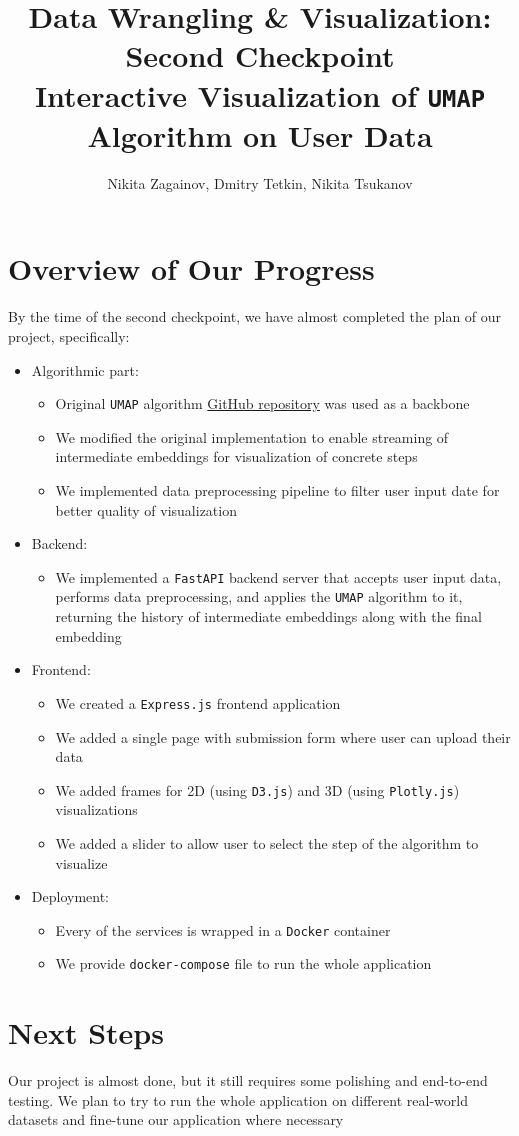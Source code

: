 \documentclass{article}
\title{Data Wrangling \& Visualization: Second Checkpoint \\
 \textbf{Interactive Visualization of \texttt{UMAP} Algorithm on User Data}}
\author{Nikita Zagainov, Dmitry Tetkin, Nikita Tsukanov}
\date{\monthname[\the\month] \the\year}
\begin{document}
\maketitle

\section{Overview of Our Progress}

By the time of the second checkpoint, we have almost completed the plan of our project, specifically:
\begin{itemize}
	\item Algorithmic part:
	      \begin{itemize}
		      \item Original \texttt{UMAP} algorithm \href{https://github.com/lmcinnes/umap}{GitHub repository} was used as a backbone
		      \item We modified the original implementation to enable streaming of intermediate embeddings for visualization of concrete steps
		      \item We implemented data preprocessing pipeline to filter user input date for better quality of visualization
	      \end{itemize}
	\item Backend:
	      \begin{itemize}
		      \item We implemented a \texttt{FastAPI} backend server that accepts user input data, performs data preprocessing, and applies the \texttt{UMAP} algorithm to it, returning the history of intermediate embeddings along with the final embedding

	      \end{itemize}
	\item Frontend:
	      \begin{itemize}
		      \item We created a \texttt{Express.js} frontend application
		      \item We added a single page with submission form where user can upload their data
		      \item We added frames for 2D (using \texttt{D3.js}) and 3D (using \texttt{Plotly.js}) visualizations
		      \item We added a slider to allow user to select the step of the algorithm to visualize
	      \end{itemize}
	\item Deployment:
	      \begin{itemize}
		      \item Every of the services is wrapped in a \texttt{Docker} container
		      \item We provide \texttt{docker-compose} file to run the whole application
	      \end{itemize}
\end{itemize}

\section{Next Steps}
Our project is almost done, but it still requires some polishing and end-to-end testing. We plan to try to run the whole application on different real-world datasets and fine-tune our application where necessary
\end{document}

